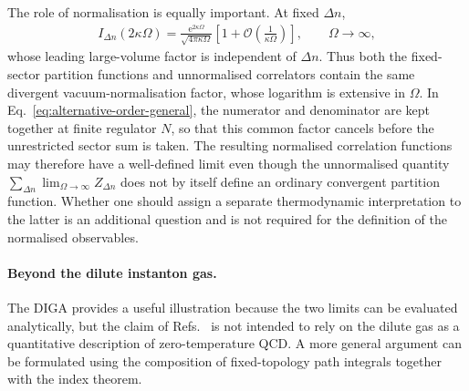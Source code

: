 \documentclass[review]{elsarticle}
\numberwithin{equation}{section}
\numberwithin{table}{section}
\numberwithin{figure}{section}
\def\e{\mathrm{e}}
\begin{document}
The role of normalisation is equally important. At fixed $\Delta n$,
\begin{align}
    I_{\Delta n}(2\kappa\Omega)
    =
    \frac{
        \e^{2\kappa\Omega}
    }{
        \sqrt{4\pi\kappa\Omega}
    }
    \left[
        1+\mathcal O\left(\frac{1}{\kappa\Omega}\right)
    \right],
    \qquad
    \Omega\to\infty,
    \label{eq:Bessel-large-volume}
\end{align}
whose leading large-volume factor is independent of $\Delta n$. Thus both the fixed-sector partition functions and unnormalised correlators contain the same divergent vacuum-normalisation factor, whose logarithm is extensive in $\Omega$. In Eq.~\eqref{eq:alternative-order-general}, the numerator and denominator are kept together at finite regulator $N$, so that this common factor cancels before the unrestricted sector sum is taken. The resulting normalised correlation functions may therefore have a well-defined limit even though the unnormalised quantity $\sum_{\Delta n}\lim_{\Omega\to\infty}Z_{\Delta n}$ does not by itself define an ordinary convergent partition function. Whether one should assign a separate thermodynamic interpretation to the latter is an additional question and is not required for the definition of the normalised observables.

\paragraph{Beyond the dilute instanton gas.}

The DIGA provides a useful illustration because the two limits can be evaluated analytically, but the claim of Refs.~\cite{Ai:2020ptm,Ai:2024cnp} is not intended to rely on the dilute gas as a quantitative description of zero-temperature QCD. A more general argument can be formulated using the composition of fixed-topology path integrals together with the index theorem.
\end{document}

